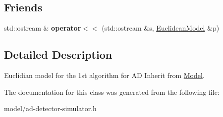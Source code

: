 \subsection*{Friends}
\begin{DoxyCompactItemize}
\item 
\hypertarget{classns3_1_1EuclideanModel_ac933d15ad4b493f033e627ac7c7b6157}{}std\+::ostream \& {\bfseries operator$<$$<$} (std\+::ostream \&s, \hyperlink{classns3_1_1EuclideanModel}{Euclidean\+Model} \&p)\label{classns3_1_1EuclideanModel_ac933d15ad4b493f033e627ac7c7b6157}

\end{DoxyCompactItemize}


\subsection{Detailed Description}
Euclidian model for the 1st algorithm for A\+D Inherit from \hyperlink{classns3_1_1Model}{Model}. 

The documentation for this class was generated from the following file\+:\begin{DoxyCompactItemize}
\item 
model/ad-\/detector-\/simulator.\+h\end{DoxyCompactItemize}
